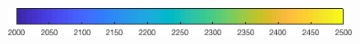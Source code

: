 \documentclass{article}
\begin{document}
\begin{figure}[htp]
\begin{subfigure}{.33\textwidth}
 \label{fig:carbon4}
\end{subfigure}
\\[+0.2cm]
\begin{subfigure}{.5\textwidth}
 \includegraphics[width=0.95\linewidth]{../separate_figures/ECOGEM/ocn_ALK_clrbr.png}
\end{subfigure}
\end{figure}
\end{document}

